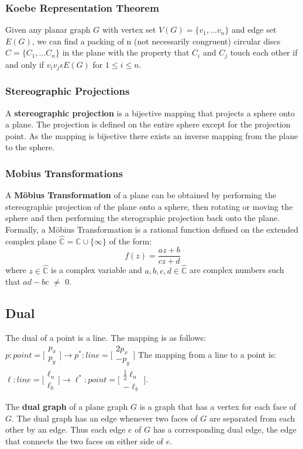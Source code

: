 \documentclass[english]{article}
\newcommand{\vect}[2]{\bigl[\begin{smallmatrix}#1\\#2\end{smallmatrix}\bigr]}
\newcommand{\C}{\mathbb{C}}
\newcommand{\CP}{\hat{\mathbb{C}}}
\begin{document}
    \subsubsection{Koebe Representation Theorem}
    Given any planar graph $G$ with vertex set $V(G) = \{v_1, ... v_n \}$ and edge set $E(G)$, we can find a packing of n (not necessarily congruent) circular discs $C= \{C_1,... C_n\}$ in the plane with the property that $C_i$ and $C_j$ touch each other if and only if $v_i v_j \epsilon E(G)$ for $1 \le i \le n$.
    \subsubsection{Stereographic Projections}
    A \textbf{stereographic projection} is a bijective mapping that projects a sphere onto a plane.
     The projection is defined on the entire sphere except for the projection point. 
    As the mapping is bijective there exists an inverse mapping from the plane to the sphere.

    \subsubsection{Mobius Transformations}
    A \textbf{M\"{o}bius Transformation} of a plane can be obtained by performing the stereographic projection of the plane onto a sphere, then rotating or moving the sphere and then performing the sterographic projection back onto the plane. 
    Formally, a M\"{o}bius Transformation is a rational function defined on the extended complex plane $\CP = \C\cup\{\infty\}$ of the form:
    \begin{equation} 
    	f(z) = \frac{az+b}{cz+d}
    \end{equation}
    where $z\in\CP$ is a complex variable and $a,b,c,d\in\CP$ are complex numbers such that $ad - bc$ $\neq$ $0$.
 
 \subsection{Dual}
  The dual of a point is a line. The mapping is as follows: $p : point = \vect{p_x}{p_y} \rightarrow p^* : line = \vect{2p_x}{-p_y}$ The mapping from a line to a point is: $\ell : line = \vect{\ell_n}{\ell_b} \rightarrow \ell^* : point = \vect{\frac{1}{2}\ell_n}{-\ell_b}$.
  
  The \textbf{dual graph} of a plane graph $G$ is a graph that has a vertex for each face of $G$. 
  The dual graph has an edge whenever two faces of $G$ are separated from each other by an edge. 
  Thus each edge $e$ of $G$ has a corresponding dual edge, the edge that connects the two faces on either side of $e$. 
\end{document}
